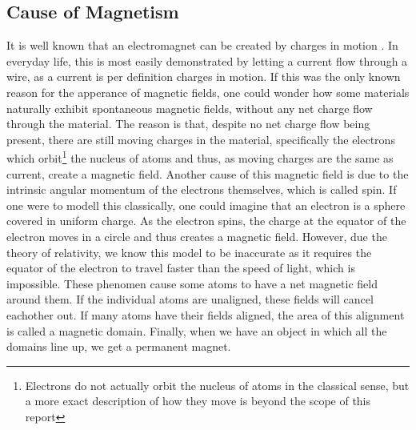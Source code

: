     \subsection{Cause of Magnetism}
    It is well known that an electromagnet can be created by charges in motion \cite{feynman_lectures_v2}. In everyday life, this is most easily demonstrated by letting a current flow through a wire, as a current is per definition charges in motion. If this was the only known reason for the apperance of magnetic fields, one could wonder how some materials naturally exhibit spontaneous magnetic fields, without any net charge flow through the material. The reason is that, despite no net charge flow being present, there are still moving charges in the material, specifically the electrons which orbit\footnote{Electrons do not actually orbit the nucleus of atoms in the classical sense, but a more exact description of how they move is beyond the scope of this report} the nucleus of atoms and thus, as moving charges are the same as current, create a magnetic field. Another cause of this magnetic field is due to the intrinsic angular momentum of the electrons themselves, which is called spin. If one were to modell this classically, one could imagine that an electron is a sphere covered in uniform charge. As the electron spins, the charge at the equator of the electron moves in a circle and thus creates a magnetic field. However, due the theory of relativity, we know this model to be inaccurate as it requires the equator of the electron to travel faster than the speed of light, which is impossible. \cite{sebens2019electrons} These phenomen cause some atoms to have a net magnetic field around them. If the individual atoms are unaligned, these fields will cancel eachother out. If many atoms have their fields aligned, the area of this alignment is called a magnetic domain. Finally, when we have an object in which all the domains line up, we get a permanent magnet.
    
